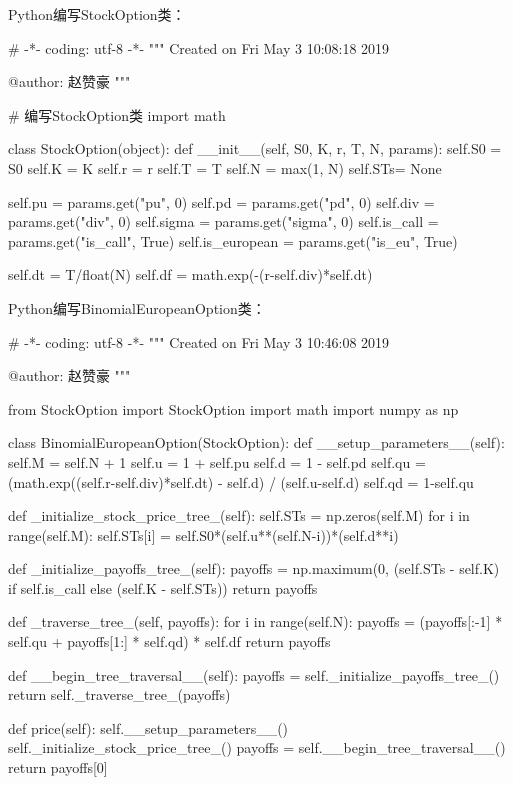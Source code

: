 Python编写StockOption类：
\begin{Python}
	
	# -*- coding: utf-8 -*-
	"""
	Created on Fri May  3 10:08:18 2019
	
	@author: 赵赞豪
	"""
	
	# 编写StockOption类
	import math
	
	class StockOption(object):
	def __init__(self, S0, K, r, T, N, params):
	self.S0 = S0
	self.K  = K
	self.r  = r
	self.T  = T
	self.N  = max(1, N)
	self.STs= None
	
	self.pu          = params.get("pu", 0)
	self.pd          = params.get("pd", 0)
	self.div         = params.get("div", 0)
	self.sigma       = params.get("sigma", 0)
	self.is_call     = params.get("is_call", True)
	self.is_european = params.get("is_eu", True)
	
	self.dt = T/float(N)
	self.df = math.exp(-(r-self.div)*self.dt)
		
\end{Python}


Python编写BinomialEuropeanOption类：
\begin{Python}
	# -*- coding: utf-8 -*-
	"""
	Created on Fri May  3 10:46:08 2019
	
	@author: 赵赞豪
	"""
	
	
	from StockOption import StockOption
	import math
	import numpy as np
	
	class BinomialEuropeanOption(StockOption):
	def __setup_parameters__(self):
	self.M  = self.N + 1
	self.u  = 1 + self.pu
	self.d  = 1 - self.pd
	self.qu = (math.exp((self.r-self.div)*self.dt) - self.d) / (self.u-self.d)
	self.qd = 1-self.qu
	
	def _initialize_stock_price_tree_(self):
	self.STs = np.zeros(self.M)
	for i in range(self.M):
	self.STs[i] = self.S0*(self.u**(self.N-i))*(self.d**i)
	
	def _initialize_payoffs_tree_(self):
	payoffs = np.maximum(0, (self.STs - self.K) if self.is_call else (self.K - self.STs))
	return payoffs
	
	def _traverse_tree_(self, payoffs):
	for i in range(self.N):
	payoffs = (payoffs[:-1] * self.qu + payoffs[1:] * self.qd) * self.df
	return payoffs
	
	def __begin_tree_traversal__(self):
	payoffs = self._initialize_payoffs_tree_()
	return self._traverse_tree_(payoffs)
	
	def price(self):
	self.__setup_parameters__()
	self._initialize_stock_price_tree_()
	payoffs = self.__begin_tree_traversal__()
	return payoffs[0]
\end{Python}


















